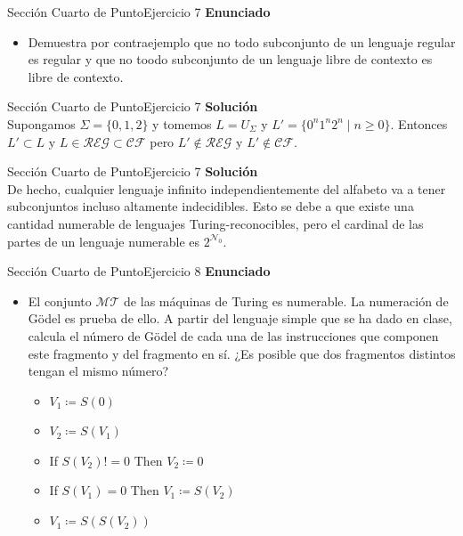 \documentclass[10pt, envcountsect, presentation, aspectratio=169]{beamer}
\newcommand{\mt}{\ensuremath{\mathcal {MT}}}
\begin{document}

\begin{frame}{Sección Cuarto de Punto}{Ejercicio 7}
\textbf{Enunciado}
	\begin{itemize}
        \item Demuestra por contraejemplo que no todo subconjunto de un lenguaje regular es regular y que no toodo subconjunto de un lenguaje libre de contexto es libre de contexto.
    \end{itemize}
\end{frame}


\begin{frame}{Sección Cuarto de Punto}{Ejercicio 7}
    \textbf{Solución}\\
    Supongamos $\Sigma = \{0,1,2\}$ y tomemos $L = U_\Sigma$ y $L'=\{0^n1^n2^n \mid n \geq 0 \}.$ Entonces $L' \subset L \text{ y } L \in \mathcal{REG} \subset \mathcal{CF}$ pero $L' \notin \mathcal{REG} \text{ y } L' \notin \mathcal{CF}.$
\end{frame}


\begin{frame}{Sección Cuarto de Punto}{Ejercicio 7}
    \textbf{Solución}\\
    De hecho, cualquier lenguaje infinito independientemente del alfabeto va a tener subconjuntos incluso altamente indecidibles. Esto se debe a que existe una cantidad numerable de lenguajes Turing-reconocibles, pero el cardinal de las partes de un lenguaje numerable es $2^{\mathcal{N}_0}.$
\end{frame}


\begin{frame}{Sección Cuarto de Punto}{Ejercicio 8}
    \textbf{Enunciado}
    \begin{itemize}
        \item El conjunto $\mt$ de las máquinas de Turing es numerable. La numeración de Gödel es prueba de ello. A partir del lenguaje simple que se ha dado en clase, calcula el número de Gödel de cada una de las instrucciones que componen este fragmento y del fragmento en sí. ¿Es posible que dos fragmentos distintos tengan el mismo número?
        \begin{itemize}
            \item[] $V_1 \coloneqq S(0)$
            \item[] $V_2 \coloneqq S(V_1)$
            \item[] If $S(V_2)!=0$ Then $V_2 \coloneqq0$
            \item[] If $S(V_1)=0$ Then $V_1 \coloneqq S(V_2)$
            \item[] $V_1 \coloneqq S(S(V_2))$
        \end{itemize}
    \end{itemize}
\end{frame}
\end{document}
